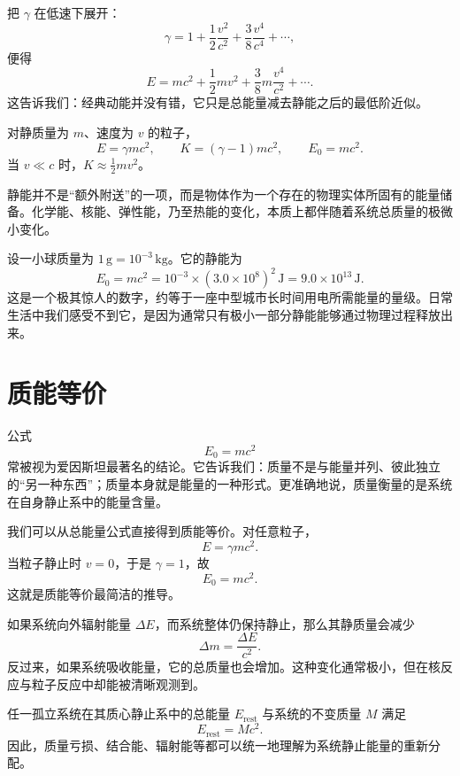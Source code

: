 把 $\gamma$ 在低速下展开：
\[
\gamma = 1 + \frac12\frac{v^2}{c^2}+\frac{3}{8}\frac{v^4}{c^4}+\cdots,
\]
便得
\[
E = mc^2 + \frac12 mv^2 + \frac38 m\frac{v^4}{c^2}+\cdots.
\]
这告诉我们：经典动能并没有错，它只是总能量减去静能之后的最低阶近似。

\begin{law}[相对论能量表达式]
对静质量为 $m$、速度为 $v$ 的粒子，
\[
E=\gamma mc^2,
\qquad
K=(\gamma-1)mc^2,
\qquad
E_0=mc^2.
\]
当 $v\ll c$ 时，$K\approx \tfrac12 mv^2$。
\end{law}

\begin{remark}
静能并不是“额外附送”的一项，而是物体作为一个存在的物理实体所固有的能量储备。化学能、核能、弹性能，乃至热能的变化，本质上都伴随着系统总质量的极微小变化。
\end{remark}

\begin{example}[静能的数量级]
设一小球质量为 $1\,\mathrm{g}=10^{-3}\,\mathrm{kg}$。它的静能为
\[
E_0 = mc^2 = 10^{-3}\times (3.0\times 10^8)^2\,\mathrm{J}
=9.0\times 10^{13}\,\mathrm{J}.
\]
这是一个极其惊人的数字，约等于一座中型城市长时间用电所需能量的量级。日常生活中我们感受不到它，是因为通常只有极小一部分静能能够通过物理过程释放出来。
\end{example}

\section{质能等价}

公式
\[
E_0=mc^2
\]
常被视为爱因斯坦最著名的结论。它告诉我们：质量不是与能量并列、彼此独立的“另一种东西”；质量本身就是能量的一种形式。更准确地说，质量衡量的是系统在自身静止系中的能量含量。

我们可以从总能量公式直接得到质能等价。对任意粒子，
\[
E=\gamma mc^2.
\]
当粒子静止时 $v=0$，于是 $\gamma=1$，故
\[
E_0=mc^2.
\]
这就是质能等价最简洁的推导。

如果系统向外辐射能量 $\Delta E$，而系统整体仍保持静止，那么其静质量会减少
\[
\Delta m = \frac{\Delta E}{c^2}.
\]
反过来，如果系统吸收能量，它的总质量也会增加。这种变化通常极小，但在核反应与粒子反应中却能被清晰观测到。

\begin{theorem}[质能等价的系统表述]
任一孤立系统在其质心静止系中的总能量 $E_{\mathrm{rest}}$ 与系统的不变质量 $M$ 满足
\[
E_{\mathrm{rest}} = Mc^2.
\]
因此，质量亏损、结合能、辐射能等都可以统一地理解为系统静止能量的重新分配。
\end{theorem}

